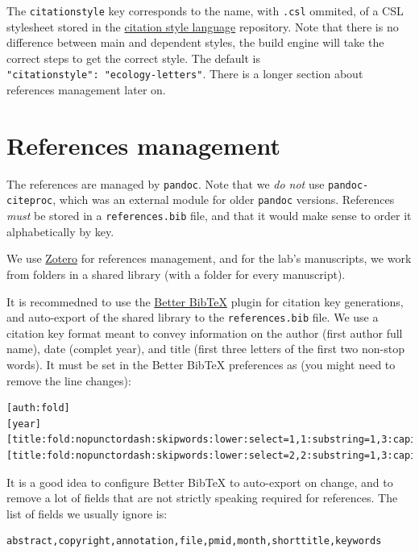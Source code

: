 \documentclass[10pt,oneside]{article}
\begin{document}
The \texttt{citationstyle} key corresponds to the name, with
\texttt{.csl} ommited, of a CSL stylesheet stored in the
\href{https://github.com/citation-style-language/}{citation style
language} repository. Note that there is no difference between main and
dependent styles, the build engine will take the correct steps to get
the correct style. The default is
\texttt{"citationstyle":\ "ecology-letters"}. There is a longer section
about references management later on.

\hypertarget{references-management}{%
\section{References management}\label{references-management}}

The references are managed by \texttt{pandoc}. Note that we \emph{do
not} use \texttt{pandoc-citeproc}, which was an external module for
older \texttt{pandoc} versions. References \emph{must} be stored in a
\texttt{references.bib} file, and that it would make sense to order it
alphabetically by key.

We use \href{https://www.zotero.org/}{Zotero} for references management,
and for the lab's manuscripts, we work from folders in a shared library
(with a folder for every manuscript).

It is recommedned to use the
\href{https://retorque.re/zotero-better-bibtex/}{Better BibTeX} plugin
for citation key generations, and auto-export of the shared library to
the \texttt{references.bib} file. We use a citation key format meant to
convey information on the author (first author full name), date (complet
year), and title (first three letters of the first two non-stop words).
It must be set in the Better BibTeX preferences as (you might need to
remove the line changes):

\begin{verbatim}
[auth:fold]
[year]
[title:fold:nopunctordash:skipwords:lower:select=1,1:substring=1,3:capitalize]
[title:fold:nopunctordash:skipwords:lower:select=2,2:substring=1,3:capitalize]
\end{verbatim}

It is a good idea to configure Better BibTeX to auto-export on change,
and to remove a lot of fields that are not strictly speaking required
for references. The list of fields we usually ignore is:

\begin{verbatim}
abstract,copyright,annotation,file,pmid,month,shorttitle,keywords
\end{verbatim}
\end{document}
